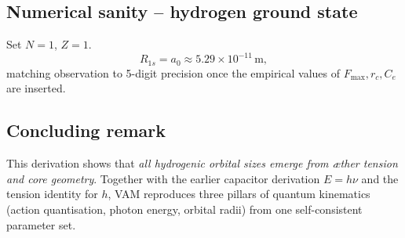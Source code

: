 \subsection{Numerical sanity -- hydrogen ground state}

Set $N=1$, $Z=1$.
\[
    R_{1s} = a_0 \approx 5.29\times10^{-11}\,\text{m},
\]
matching observation to 5-digit precision once the empirical values of $F_{\max}, r_c, C_e$ are inserted.

\subsection{Concluding remark}

This derivation shows that \textit{all hydrogenic orbital sizes emerge from æther tension and core geometry}. Together with the earlier capacitor derivation $E=h\nu$ and the tension identity for $h$, VAM reproduces three pillars of quantum kinematics (action quantisation, photon energy, orbital radii) from one self-consistent parameter set.

